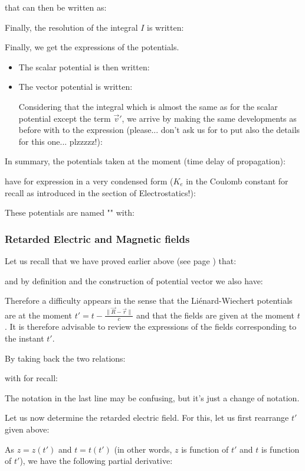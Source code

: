 	that can then be written as:
	
	Finally, the resolution of the integral $I$ is written:
	
	Finally, we get the expressions of the potentials.
	\begin{itemize}
		\item The scalar potential is then written:
		

		\item The vector potential is written:
		
		Considering that the integral which is almost the same as for the scalar potential except the term $\vec{v}'$, we arrive by making the same developments as before with to the expression (please... don't ask us for to put also the details for this one... plzzzzz!):
	
	\end{itemize}
	In summary, the potentials taken at the moment (time delay of propagation):
	
	have for expression in a very condensed form ($K_e$ in the Coulomb constant for recall as introduced in the section of Electrostatics!):
	
	These potentials are named "" with:
	
	
	\subsubsection{Retarded Electric and Magnetic fields}
	Let us recall that we have proved earlier above (see page \pageref{electric field with potential vector}) that:
	
	and by definition and the construction of potential vector we also have:
	
	Therefore a difficulty appears in the sense that the Liénard-Wiechert potentials are at the moment $t'=t-\frac{\|\vec{R}-\vec{r}\|}{c}$ and that the fields are given at the moment $t$. It is therefore advisable to review the expressions of the fields corresponding to the instant $t'$. 
	
	By taking back the two relations:
	
	with for recall:
	
	The notation in the last line may be confusing, but it's just a change of notation.
	
	Let us now determine the retarded electric field. For this, let us first rearrange $t'$ given above:
	
	As $z=z(t')$ and $t=t(t')$ (in other words, $z$ is function of $t'$ and $t$ is function of $t'$), we have the following partial derivative:
	
